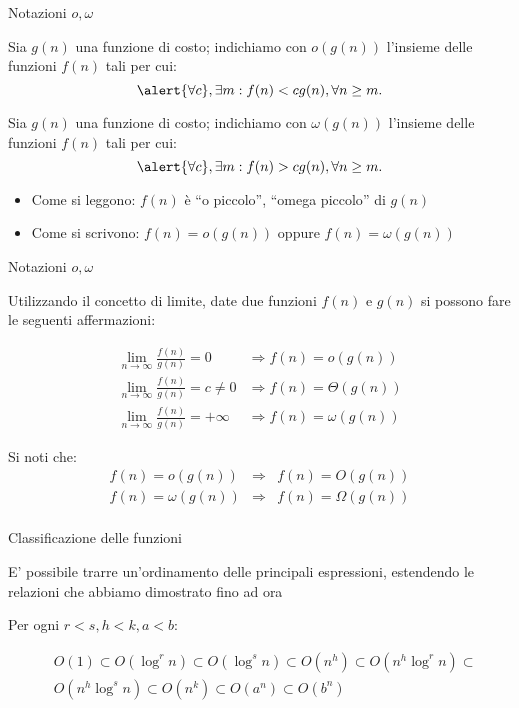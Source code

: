	
\begin{frame}{Notazioni $o, \omega$}

\begin{myboxtitle}
Sia $g(n)$ una funzione di costo; indichiamo con \alert{$o(g(n))$} l'insieme 
delle funzioni $f(n)$ tali per cui:\\[-6pt]
\[
  \alert{\forall c}, \exists m: f(n) < c g(n), \forall n \geq m.
\]

Sia $g(n)$ una funzione di costo; indichiamo con \alert{$\omega(g(n))$} l'insieme 
delle funzioni $f(n)$ tali per cui:\\[-6pt]
\[
  \alert{\forall c}, \exists m: f(n) > c g(n), \forall n \geq m.
\]
\end{myboxtitle}

\begin{itemize}	
\item Come si leggono: $f(n)$ è “\alert{o piccolo}”, “\alert{omega piccolo}” di $g(n)$
\item Come si scrivono: $f(n) = o(g(n))$ oppure $f(n) = \omega(g(n))$
\end{itemize}	

\end{frame}

\begin{frame}{Notazioni $o, \omega$}

Utilizzando il concetto di limite, date due funzioni $f(n)$ e $g(n)$ si
possono fare le seguenti affermazioni:

\begin{align*}
\lim_{n \rightarrow \infty} \frac{f(n)}{g(n)} = 0 & \Rightarrow f(n) = o(g(n)) \\
\lim_{n \rightarrow \infty} \frac{f(n)}{g(n)} = c \neq 0 & \Rightarrow f(n) = \Theta(g(n)) \\
\lim_{n \rightarrow \infty} \frac{f(n)}{g(n)} = +\infty  & \Rightarrow f(n) = \omega(g(n)) 
\end{align*}

\bigskip	
Si noti che:
\begin{eqnarray*}
  f(n) = o(g(n)) &\Rightarrow& f(n) = O(g(n)) \\
  f(n) = \omega(g(n)) &\Rightarrow& f(n) = \Omega(g(n)) \\
\end{eqnarray*}
	
\end{frame}

\begin{frame}{Classificazione delle funzioni}

E' possibile trarre un'ordinamento delle principali espressioni, estendendo le relazioni
che abbiamo dimostrato fino ad ora

\bigskip
Per ogni $r < s, h < k, a < b$:

\begin{align*}
&O(1) \subset O(\log^r n) \subset O(\log^s n) \subset O(n^h) \subset O(n^h \log^r n)  \subset \\
& O(n^h \log^s n) \subset O(n^k) \subset O(a^n) \subset  O(b^n)
\end{align*}

\end{frame}


